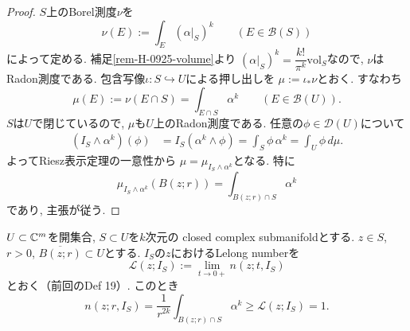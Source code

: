 \begin{proof}
$S$上のBorel測度$\nu$を
\begin{equation*}
\nu(E):=\int_E\left(\left.\alpha\right|_S\right)^k
\qquad (E\in\mathcal{B}(S))
\end{equation*}
によって定める.
補足\ref{rem-H-0925-volume}より
$\left(\left.\alpha\right|_S\right)^k
=\dfrac{k!}{\pi^k}\mathrm{vol}_S$なので, $\nu$はRadon測度である.
包含写像$\iota\colon S\hookrightarrow U$による押し出しを
$\mu:=\iota_*\nu$とおく. すなわち
\begin{equation*}
\mu(E):=\nu(E\cap S)=\int_{E\cap S}\alpha^k
\qquad (E\in\mathcal{B}(U)).
\end{equation*}
$S$は$U$で閉じているので, $\mu$も$U$上のRadon測度である.
任意の$\phi\in\mathcal{D}(U)$について
\begin{align*}
(I_S\wedge\alpha^k)(\phi)
&=I_S(\alpha^k\wedge\phi)
=\int_S\phi\,\alpha^k
=\int_U\phi\,d\mu.
\end{align*}
よってRiesz表示定理の一意性から
$\mu=\mu_{I_S\wedge\alpha^k}$となる.
特に
\begin{equation*}
\mu_{I_S\wedge\alpha^k}(B(z;r))
=\int_{B(z;r)\cap S}\alpha^k
\end{equation*}
であり, 主張が従う.
\end{proof}

\begin{tcolorbox}[mybox]
\begin{prop}[{野口--落合, (3.2.39)}]
\label{prop-H-0925-lelong}
$U\subset\mathbb{C}^m$を開集合, $S\subset U$を$k$次元の
closed complex submanifoldとする.
$z\in S$, $r>0$, $\overline{B(z;r)}\subset U$とする.
$I_S$の$z$におけるLelong numberを
\begin{equation*}
\mathcal{L}(z;I_S):=\lim_{t\to0+}n(z;t,I_S)
\end{equation*}
とおく（前回のDef 19）. このとき
\begin{equation*}
n(z;r,I_S)
=\frac{1}{r^{2k}}\int_{B(z;r)\cap S}\alpha^k
\geq\mathcal{L}(z;I_S)=1.
\end{equation*}
\end{prop}
\end{tcolorbox}

